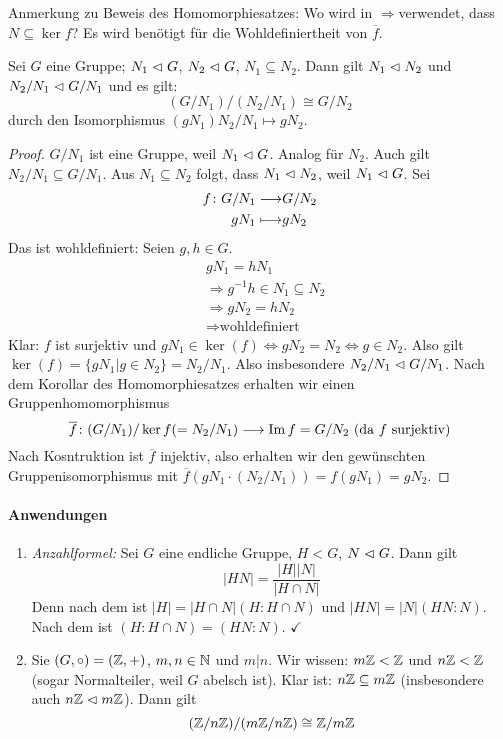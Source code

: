 \documentclass[12pt,a4paper]{scrartcl}
\begin{document}
\noindent Anmerkung zu Beweis des Homomorphiesatzes: Wo wird in \glqq$\Rightarrow$\grqq verwendet, dass $N\subseteq \ker f$? Es wird benötigt für die Wohldefiniertheit von $\overline{f}$.

\begin{satz}[2. Isomorphiesatz] \label{thm:iso2_g}
	Sei $G$ eine Gruppe; $N_1\vartriangleleft G$, $N_2\vartriangleleft G$, $N_1\subseteq N_2$. Dann gilt $N_1\vartriangleleft N_2$ und $N_2/N_1\vartriangleleft G/N_1$ und es gilt:
	$$(G/N_1)/(N_2/N_1) \cong G/N_2$$ durch den Isomorphismus $(gN_1)N_2/N_1\mapsto gN_2$.
\end{satz}	

\begin{proof}
	$G/N_1$ ist eine Gruppe, weil $N_1\vartriangleleft G$. Analog für $N_2$. Auch gilt $N_2/N_1\subseteq G/N_1$. Aus $N_1\subseteq N_2$ folgt, dass $N_1\vartriangleleft N_2$, weil $N_1\vartriangleleft G$. Sei
	\begin{align*}
		f\colon G/N_1  \longrightarrow &G/N_2\\
		gN_1  \longmapsto & gN_2
	\end{align*}
	Das ist wohldefiniert: Seien $g, h\in G$.
	\begin{align*}
		&gN_1 = hN_1 \\
		&\Rightarrow g^{-1}h\in N_1\subseteq N_2 \\
		&\Rightarrow gN_2 = hN_2 \\
		&\Rightarrow \text{wohldefiniert}
	\end{align*}
	Klar: $f$ ist surjektiv und $gN_1\in \ker(f)\Leftrightarrow gN_2 = N_2\Leftrightarrow g\in N_2$. Also gilt $\ker(f) = \{gN_1|g\in N_2\} = N_2/N_1$. Also insbesondere $N_2/N_1\vartriangleleft G/N_1$.
	Nach dem Korollar des Homomorphiesatzes erhalten wir einen Gruppenhomomorphismus
	$$ \overline{f}\colon (G/N_1)/\operatorname{ker} f(=N_2/N_1)\longrightarrow \operatorname{Im} f = G/N_2 \mbox{ (da $f$ surjektiv)}$$
	Nach Kosntruktion ist $\overline{f}$ injektiv, also erhalten wir den gewünschten Gruppenisomorphismus mit $\overline{f}(gN_1\cdot (N_2/N_1)) = f(gN_1) = gN_2$.
\end{proof}

\paragraph{Anwendungen}
\begin{enumerate}
	\item \textit{Anzahlformel:} Sei $G$ eine endliche Gruppe, $H<G$, $N\vartriangleleft G$. Dann gilt $$|HN| =\frac{ |H||N|}{|H\cap N|}$$ 
	Denn nach dem  ist $|H| = |H\cap N|(H:H\cap N)$ und $|HN| = |N|(HN:N)$. Nach dem  ist $(H:H\cap N)=(HN:N)$. \hfill $\checkmark$
	\item Sie $(G,\circ) = (\mathbb Z, +)$, $m,n\in\mathbb N$ und $m|n$. Wir wissen: $m\mathbb Z<\mathbb Z$ und $n\mathbb Z<\mathbb Z$ (sogar Normalteiler, weil $G$ abelsch ist). Klar ist: $n\mathbb Z\subseteq m\mathbb Z$ (insbesondere auch $n\mathbb Z\vartriangleleft m\mathbb Z$). Dann gilt 
	$$(\mathbb Z/n\mathbb Z)/(m\mathbb Z/n\mathbb Z) \cong \mathbb Z/m\mathbb Z$$
\end{enumerate}
\end{document}

